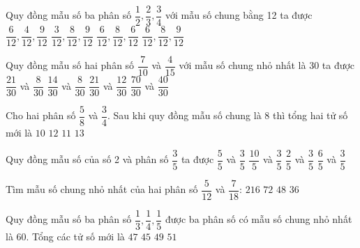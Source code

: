 \begin{ex} %
Quy đồng mẫu số ba phân số $\dfrac{1}{2}, \dfrac{2}{3}, \dfrac{3}{4}$ với mẫu số chung bằng 12 ta được
\choice
{$\dfrac{6}{12}, \dfrac{4}{12}, \dfrac{9}{12}$}
{$\dfrac{3}{12}, \dfrac{8}{12}, \dfrac{9}{12}$}
{$\dfrac{6}{12}, \dfrac{8}{12}, \dfrac{6}{12}$}
{\True $\dfrac{6}{12}, \dfrac{8}{12}, \dfrac{9}{12}$}
\end{ex}

\begin{ex} %
Quy đồng mẫu số hai phân số $\dfrac{7}{10}$ và $\dfrac{4}{15}$ với mẫu số chung nhỏ nhất là 30 ta được
\choice
{\True $\dfrac{21}{30}$ và $\dfrac{8}{30}$}
{$\dfrac{14}{30}$ và $\dfrac{8}{30}$}
{$\dfrac{21}{30}$ và $\dfrac{12}{30}$}
{$\dfrac{70}{30}$ và $\dfrac{40}{30}$}
\end{ex}

\begin{ex} %
Cho hai phân số $\dfrac{5}{8}$ và $\dfrac{3}{4}$. Sau khi quy đồng mẫu số chung là 8 thì tổng hai tử số mới là
\choice
{$10$}
{$12$}
{\True $11$}
{$13$}
\end{ex}

\begin{ex} %
Quy đồng mẫu số của số 2 và phân số $\dfrac{3}{5}$ ta được
\choice
{$\dfrac{5}{5}$ và $\dfrac{3}{5}$}
{\True $\dfrac{10}{5}$ và $\dfrac{3}{5}$}
{$\dfrac{2}{5}$ và $\dfrac{3}{5}$}
{$\dfrac{6}{5}$ và $\dfrac{3}{5}$}
\end{ex}

\begin{ex} %
Tìm mẫu số chung nhỏ nhất của hai phân số $\dfrac{5}{12}$ và $\dfrac{7}{18}$:
\choice
{$216$}
{$72$}
{$48$}
{\True $36$}
\end{ex}

\begin{ex} %
Quy đồng mẫu số ba phân số $\dfrac{1}{3}, \dfrac{1}{4}, \dfrac{1}{5}$ được ba phân số có mẫu số chung nhỏ nhất là 60. Tổng các tử số mới là
\choice
{\True $47$}
{$45$}
{$49$}
{$51$}
\end{ex}

